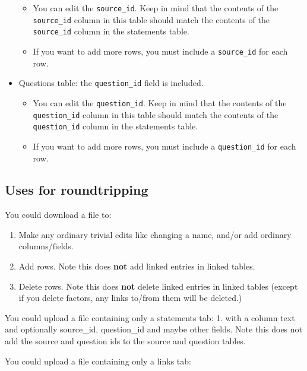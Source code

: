 \documentclass[
]{book}
\providecommand{\tightlist}{%
  \setlength{\itemsep}{0pt}\setlength{\parskip}{0pt}}
\begin{document}
\begin{itemize}
  \begin{itemize}
  \tightlist
  \item
    You can edit the \texttt{source\_id}. Keep in mind that the contents of the \texttt{source\_id} column in this table should match the contents of the \texttt{source\_id} column in the statements table.
  \item
    If you want to add more rows, you must include a \texttt{source\_id} for each row.
  \end{itemize}
\item
  Questions table: the \texttt{question\_id} field is included.

  \begin{itemize}
  \tightlist
  \item
    You can edit the \texttt{question\_id}. Keep in mind that the contents of the \texttt{question\_id} column in this table should match the contents of the \texttt{question\_id} column in the statements table.
  \item
    If you want to add more rows, you must include a \texttt{question\_id} for each row.
  \end{itemize}
\end{itemize}

\hypertarget{uses-for-roundtripping}{%
\subsection{Uses for roundtripping}\label{uses-for-roundtripping}}

You could download a file to:

\begin{enumerate}
\def\labelenumi{\arabic{enumi}.}
\tightlist
\item
  Make any ordinary trivial edits like changing a name, and/or add ordinary columns/fields.
\item
  Add rows. Note this does \textbf{not} add linked entries in linked tables.
\item
  Delete rows. Note this does \textbf{not} delete linked entries in linked tables (except if you delete factors, any links to/from them will be deleted.)
\end{enumerate}

You could upload a file containing only a statements tab:
1. with a column text and optionally source\_id, question\_id and maybe other fields. Note this does not add the source and question ids to the source and question tables.

You could upload a file containing only a links tab:
\end{document}
